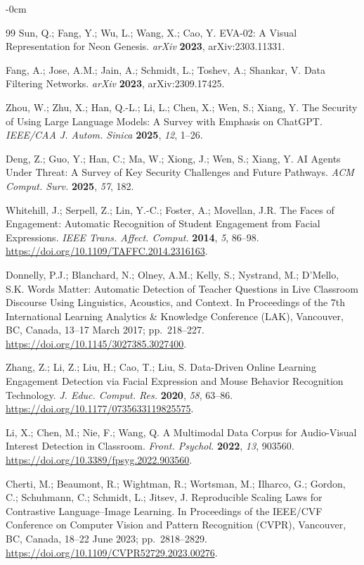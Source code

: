 \documentclass[symmetry,article,submit,pdftex,moreauthors]{Definitions/mdpi}
\begin{document}
\begin{adjustwidth}{-\extralength}{0cm}
\begin{thebibliography}{99}
Sun, Q.; Fang, Y.; Wu, L.; Wang, X.; Cao, Y.
EVA-02: A Visual Representation for Neon Genesis.
\textit{arXiv} \textbf{2023}, arXiv:2303.11331.

Fang, A.; Jose, A.M.; Jain, A.; Schmidt, L.; Toshev, A.; Shankar, V.
Data Filtering Networks.
\textit{arXiv} \textbf{2023}, arXiv:2309.17425.

Zhou, W.; Zhu, X.; Han, Q.-L.; Li, L.; Chen, X.; Wen, S.; Xiang, Y.
The Security of Using Large Language Models: A Survey with Emphasis on ChatGPT.
\textit{IEEE/CAA J. Autom. Sinica} \textbf{2025}, \textit{12}, 1--26.

Deng, Z.; Guo, Y.; Han, C.; Ma, W.; Xiong, J.; Wen, S.; Xiang, Y.
AI Agents Under Threat: A Survey of Key Security Challenges and Future Pathways.
\textit{ACM Comput. Surv.} \textbf{2025}, \textit{57}, 182.

Whitehill, J.; Serpell, Z.; Lin, Y.-C.; Foster, A.; Movellan, J.R.
The Faces of Engagement: Automatic Recognition of Student Engagement from Facial Expressions.
\textit{IEEE Trans. Affect. Comput.} \textbf{2014}, \textit{5}, 86--98. \url{https://doi.org/10.1109/TAFFC.2014.2316163}.

Donnelly, P.J.; Blanchard, N.; Olney, A.M.; Kelly, S.; Nystrand, M.; D'Mello, S.K.
Words Matter: Automatic Detection of Teacher Questions in Live Classroom Discourse Using Linguistics, Acoustics, and Context.
In Proceedings of the 7th International Learning Analytics \& Knowledge Conference (LAK), Vancouver, BC, Canada, 13--17 March 2017; pp.~218--227. \url{https://doi.org/10.1145/3027385.3027400}.

Zhang, Z.; Li, Z.; Liu, H.; Cao, T.; Liu, S.
Data-Driven Online Learning Engagement Detection via Facial Expression and Mouse Behavior Recognition Technology.
\textit{J. Educ. Comput. Res.} \textbf{2020}, \textit{58}, 63--86. \url{https://doi.org/10.1177/0735633119825575}.

Li, X.; Chen, M.; Nie, F.; Wang, Q.
A Multimodal Data Corpus for Audio-Visual Interest Detection in Classroom.
\textit{Front. Psychol.} \textbf{2022}, \textit{13}, 903560. \url{https://doi.org/10.3389/fpsyg.2022.903560}.

Cherti, M.; Beaumont, R.; Wightman, R.; Wortsman, M.; Ilharco, G.; Gordon, C.; Schuhmann, C.; Schmidt, L.; Jitsev, J.
Reproducible Scaling Laws for Contrastive Language--Image Learning.
In Proceedings of the IEEE/CVF Conference on Computer Vision and Pattern Recognition (CVPR), Vancouver, BC, Canada, 18--22 June 2023; pp.~2818--2829. \url{https://doi.org/10.1109/CVPR52729.2023.00276}.


\end{thebibliography}
\end{adjustwidth}
\end{document}
